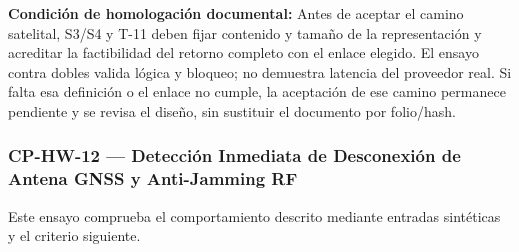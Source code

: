 \par\noindent\textbf{Condición de homologación documental:} Antes de aceptar el camino satelital, S3/S4 y T-11 deben fijar contenido y tamaño de la representación y acreditar la factibilidad del retorno completo con el enlace elegido. El ensayo contra dobles valida lógica y bloqueo; no demuestra latencia del proveedor real. Si falta esa definición o el enlace no cumple, la aceptación de ese camino permanece pendiente y se revisa el diseño, sin sustituir el documento por folio/hash.\par

\subsubsection*{CP-HW-12 — Detección Inmediata de Desconexión de Antena GNSS y Anti-Jamming RF}\label{sec:9-cp-hw-12}
Este ensayo comprueba el comportamiento descrito mediante entradas sintéticas y el criterio siguiente.

